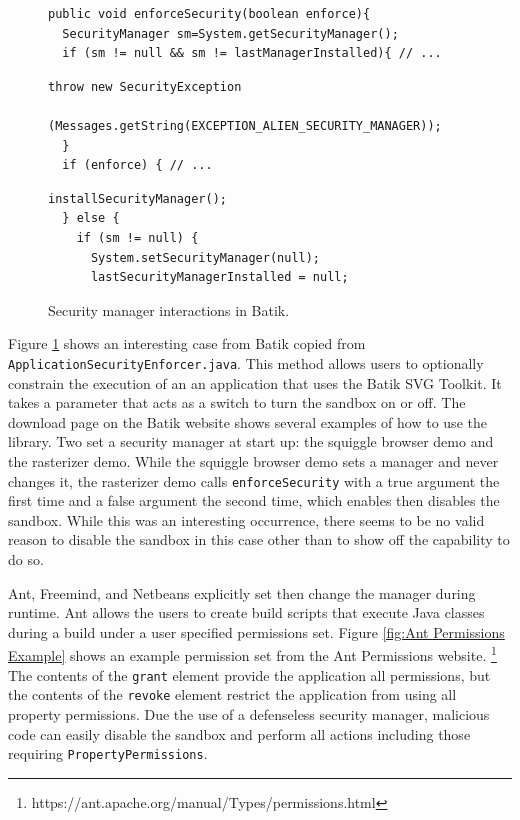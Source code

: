 \documentclass{sig-alternate}
\begin{document}
\begin{figure}
\begin{lstlisting}[firstnumber=156]
public void enforceSecurity(boolean enforce){ 
  SecurityManager sm=System.getSecurityManager();
  if (sm != null && sm != lastManagerInstalled){ // ...
\end{lstlisting}
\vspace{-0.3cm}
\begin{lstlisting}[firstnumber=163]
   throw new SecurityException
     (Messages.getString(EXCEPTION_ALIEN_SECURITY_MANAGER));   
  }                  
  if (enforce) { // ...
\end{lstlisting}
\vspace{-0.3cm}
\begin{lstlisting}[firstnumber=173]
    installSecurityManager();         
  } else {             
    if (sm != null) {                 
      System.setSecurityManager(null);
      lastSecurityManagerInstalled = null;             
\end{lstlisting}
\caption{Security manager interactions \label{fig:Batik-snippet} in
  Batik.}
\end{figure}


Figure \ref{fig:Batik-snippet} shows an interesting case from Batik
copied from \texttt{ApplicationSecurityEnforcer.java}. This method
allows users to optionally constrain the execution of an an application
that uses the Batik SVG Toolkit. It takes a parameter that acts as
a switch to turn the sandbox on or off. The download page on the Batik
website shows several examples of how to use the library. Two set
a security manager at start up: the squiggle browser demo and the
rasterizer demo. While the squiggle browser demo sets a manager and
never changes it, the rasterizer demo calls \texttt{enforceSecurity}
with a true argument the first time and a false argument the second
time, which enables then disables the sandbox. While this was an interesting
occurrence, there seems to be no valid reason to disable the sandbox
in this case other than to show off the capability to do so.

Ant, Freemind, and Netbeans explicitly set then change the manager
during runtime. Ant allows the users to create build scripts that
execute Java classes during a build under a user specified
permissions set. Figure \ref{fig:Ant Permissions Example}
shows an example permission set from the Ant Permissions website.%
\footnote{https://ant.apache.org/manual/Types/permissions.html%
} The contents of the \texttt{grant} element provide the application
all permissions, but the contents of the \texttt{revoke} element restrict
the application from using all property permissions. Due the use of a
defenseless security manager, malicious code can easily disable the sandbox and perform all actions
including those requiring \texttt{PropertyPermissions}. 
\end{document}
